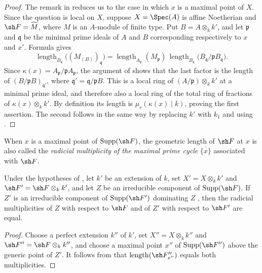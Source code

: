 \begin{proof}
The remark in  reduces us to the case in which $x$ is
a maximal point of $X$.
Since the question is local on $X$, suppose
$X=\Spec(A)$ is affine Noetherian and $\sh F=\widetilde M$, where
$M$ is an $A$-module of finite type.
Put $B=A\otimes_k k'$, and let $\mathfrak p$ and $\mathfrak q$ be the
minimal prime ideals of $A$ and $B$ corresponding respectively to
$x$ and $x'$.
Formula  gives
\[
\operatorname{length}_{B_{\mathfrak q}}
 \bigl((M_{(B)})_{\mathfrak q}\bigr)
=
\operatorname{length}_{A_{\mathfrak p}}(M_{\mathfrak p})\,
\operatorname{length}_{B_{\mathfrak q}}
 \bigl(B_{\mathfrak q}/\mathfrak pB_{\mathfrak q}\bigr).
\]
Since
$\kappa(x)=A_{\mathfrak p}/\mathfrak pA_{\mathfrak p}$, the argument
of  shows that the last factor is the length of
$(B/\mathfrak pB)_{\mathfrak q'}$, where
$\mathfrak q'=\mathfrak q/\mathfrak pB$.
This is a local ring of
$(A/\mathfrak p)\otimes_k k'$ at a minimal prime ideal, and therefore
also a local ring of the total ring of fractions of
$\kappa(x)\otimes_k k'$.
By definition its length is $\mu_r(\kappa(x)\mid k)$, proving the
first assertion.
The second follows in the same way by replacing $k'$ with $k_1$ and
using .
\end{proof}

When $x$ is a maximal point of $\operatorname{Supp}(\sh F)$, the
geometric length of $\sh F$ at $x$ is also called the
\emph{radicial multiplicity of the maximal prime cycle}
$\overline{\{x\}}$ associated with $\sh F$.

\begin{corollary}[4.7.9]
\label{IV.4.7.9}
Under the hypotheses of , let $k'$ be an extension of
$k$, set $X'=X\otimes_k k'$ and $\sh F'=\sh F\otimes_k k'$, and let
$Z$ be an irreducible component of $\operatorname{Supp}(\sh F)$.
If $Z'$ is an irreducible component of
$\operatorname{Supp}(\sh F')$ dominating $Z$
, then the radicial multiplicities of $Z$ with respect
to $\sh F$ and of $Z'$ with respect to $\sh F'$ are equal.
\end{corollary}

\begin{proof}
Choose a perfect extension $k''$ of $k'$, set
$X''=X\otimes_k k''$ and $\sh F''=\sh F\otimes_k k''$, and choose a
maximal point $x''$ of $\operatorname{Supp}(\sh F'')$ above the
generic point of $Z'$.
It follows from  that
$\operatorname{length}(\sh F''_{x''})$ equals both multiplicities.
\end{proof}

